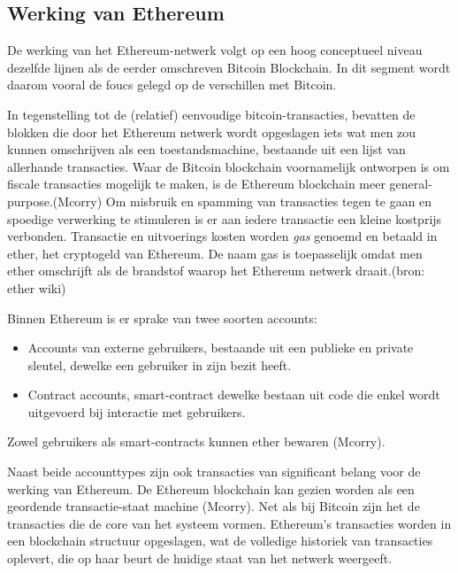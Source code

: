 	\subsection{Werking van Ethereum}
		De werking van het Ethereum-netwerk volgt op een hoog conceptueel niveau dezelfde lijnen als de eerder omschreven Bitcoin Blockchain. In dit segment wordt daarom vooral de foucs gelegd op de verschillen met Bitcoin. 
		
		In tegenstelling tot de (relatief) eenvoudige bitcoin-transacties, bevatten de blokken die door het Ethereum netwerk wordt opgeslagen iets wat men zou kunnen omschrijven als een toestandsmachine, bestaande uit een lijst van allerhande transacties. Waar de Bitcoin blockchain voornamelijk ontworpen is om fiscale transacties mogelijk te maken, is de Ethereum blockchain meer general-purpose.(Mcorry) Om misbruik en spamming van transacties tegen te gaan en spoedige verwerking te stimuleren is er aan iedere transactie een kleine kostprijs verbonden. Transactie en uitvoerings kosten worden \textit{gas} genoemd en betaald in ether, het cryptogeld van Ethereum. De naam gas is toepasselijk omdat men ether omschrijft als de brandstof waarop het Ethereum netwerk draait.(bron: ether wiki)
		
		Binnen Ethereum is er sprake van twee soorten accounts: 
		\begin{itemize}
			\item Accounts van externe gebruikers, bestaande uit een publieke en private sleutel, dewelke een gebruiker in zijn bezit heeft.
			\item Contract accounts, smart-contract dewelke bestaan uit code die enkel wordt uitgevoerd bij interactie met gebruikers.
		\end{itemize}	
		Zowel gebruikers als smart-contracts kunnen ether bewaren (Mcorry). 
		
		Naast beide accounttypes zijn ook transacties van significant belang voor de werking van Ethereum. De Ethereum blockchain kan gezien worden als een geordende transactie-staat machine (Mcorry). Net als bij Bitcoin zijn het  de transacties die  de core van het systeem vormen. Ethereum's transacties worden in een blockchain structuur opgeslagen, wat de volledige historiek van transacties oplevert, die  op haar beurt de huidige staat van het netwerk weergeeft.
		
